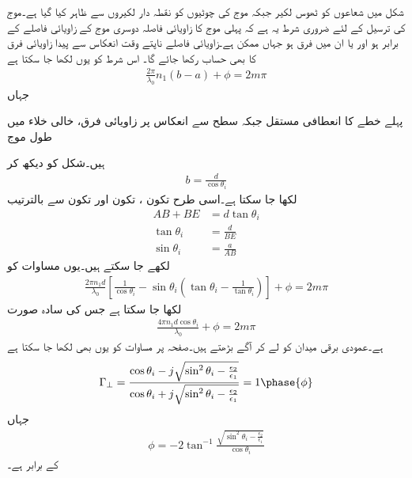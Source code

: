 شکل  میں شعاعوں کو ٹھوس لکیر جبکہ موج کی چوٹیوں کو نقطہ دار لکیروں سے ظاہر کیا گیا ہے۔موج کی ترسیل کے لئے ضروری شرط یہ ہے کہ پہلی موج کا زاویائی فاصلہ  دوسری موج کے زاویائی فاصلے  کے برابر ہو اور یا ان میں فرق  ہو جہاں  ممکن ہے۔زاویائی فاصلے ناپتے وقت انعکاس سے پیدا زاویائی فرق کا بھی حساب رکھا جائے گا۔ اس شرط کو یوں لکھا جا سکتا ہے
\begin{align}\label{مساوات_مویج_تختے_میں_ممکن_زاویے}
\frac{2\pi}{\lambda_0} n_1 (b-a)+\phi=2 m\pi
\end{align}
جہاں
\begin{description}
 پہلے خطے کا  انعطافی مستقل  جبکہ
 سطح سے انعکاس پر  زاویائی فرق،
 خالی خلاء میں طول موج
\end{description}
ہیں۔شکل  کو دیکھ کر
\begin{align}
b=\frac{d}{\cos \theta_i}
\end{align}
لکھا جا سکتا ہے۔اسی طرح تکون ، تکون  اور تکون  سے بالترتیب  
\begin{align*}
AB+BE&=d\tan \theta_i\\
\tan \theta_i&=\frac{d}{BE}\\
\sin\theta_i &=\frac{a}{AB}
\end{align*}
لکھے جا سکتے ہیں۔یوں مساوات  کو
\begin{align}
\frac{2\pi n_1 d}{\lambda_0} \left[\frac{1}{\cos \theta_i}-\sin \theta_i \left(\tan \theta_i-\frac{1}{\tan \theta_i} \right) \right]+\phi=2 m \pi
\end{align}
لکھا جا سکتا ہے جس کی سادہ صورت
\begin{align}\label{مساوات_مویج_تختہ_ت}
\frac{4\pi n_1 d \cos \theta_i}{\lambda_0}+\phi=2 m \pi
\end{align}
ہے۔عمودی برقی میدان  کو لے کر آگے بڑھتے ہیں۔صفحہ  پر مساوات  کو یوں بھی لکھا جا سکتا ہے
\begin{align}\label{مساوات_مویج_تختہ_ٹ}
\Gamma_{\perp}=\frac{\cos \theta_i-j \sqrt{\sin^2 \theta_i-\frac{\epsilon_2}{\epsilon_1}}}{\cos \theta_i+j \sqrt{\sin^2 \theta_i-\frac{\epsilon_2}{\epsilon_1}}}=1\phase{\phi}
\end{align}
جہاں
\begin{align}
\phi=-2\tan^{-1} \frac{\sqrt{\sin^2 \theta_i -\frac{\epsilon_2}{\epsilon_1}} }{\cos \theta_i}
\end{align}
کے برابر ہے۔


